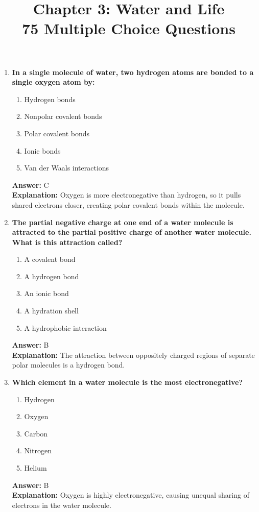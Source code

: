 \documentclass[11pt, a4paper]{article}
\title{\textbf{Chapter 3: Water and Life \\ 75 Multiple Choice Questions}}
\author{}
\date{}
\begin{document}
\maketitle

\begin{enumerate}


\item \textbf{In a single molecule of water, two hydrogen atoms are bonded to a single oxygen atom by:}
\begin{enumerate}[label=\Alph*.]
    \item Hydrogen bonds
    \item Nonpolar covalent bonds
    \item Polar covalent bonds
    \item Ionic bonds
    \item Van der Waals interactions
\end{enumerate}
\textbf{Answer:} C \\
\textbf{Explanation:} Oxygen is more electronegative than hydrogen, so it pulls shared electrons closer, creating polar covalent bonds within the molecule.

\item \textbf{The partial negative charge at one end of a water molecule is attracted to the partial positive charge of another water molecule. What is this attraction called?}
\begin{enumerate}[label=\Alph*.]
    \item A covalent bond
    \item A hydrogen bond
    \item An ionic bond
    \item A hydration shell
    \item A hydrophobic interaction
\end{enumerate}
\textbf{Answer:} B \\
\textbf{Explanation:} The attraction between oppositely charged regions of separate polar molecules is a hydrogen bond.

\item \textbf{Which element in a water molecule is the most electronegative?}
\begin{enumerate}[label=\Alph*.]
    \item Hydrogen
    \item Oxygen
    \item Carbon
    \item Nitrogen
    \item Helium
\end{enumerate}
\textbf{Answer:} B \\
\textbf{Explanation:} Oxygen is highly electronegative, causing unequal sharing of electrons in the water molecule.


\end{enumerate}
\end{document}
